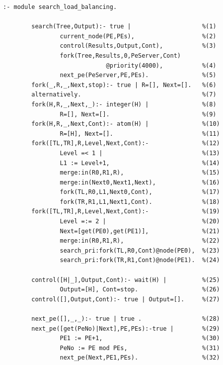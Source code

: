 \documentclass[a4,titlepage]{jsreport}
\begin{document}
\begin{Verbatim}[baselinestretch=0.8]
:- module search_load_balancing.

        search(Tree,Output):- true |                    %(1)
                current_node(PE,PEs),                   %(2)
                control(Results,Output,Cont),           %(3)
                fork(Tree,Results,0,PeServer,Cont)
                             @priority(4000),           %(4)
                next_pe(PeServer,PE,PEs).               %(5)
        fork(_,R,_,Next,stop):- true | R=[], Next=[].   %(6)
        alternatively.                                  %(7)
        fork(H,R,_,Next,_):- integer(H) |               %(8)
                R=[], Next=[].                          %(9)
        fork(H,R,_,Next,Cont):- atom(H) |               %(10)
                R=[H], Next=[].                         %(11)
        fork([TL,TR],R,Level,Next,Cont):-               %(12)
                Level =< 1 |                            %(13)
                L1 := Level+1,                          %(14)
                merge:in(R0,R1,R),                      %(15)
                merge:in(Next0,Next1,Next),             %(16)
                fork(TL,R0,L1,Next0,Cont),              %(17)
                fork(TR,R1,L1,Next1,Cont).              %(18)
        fork([TL,TR],R,Level,Next,Cont):-               %(19)
                Level =:= 2 |                           %(20)
                Next=[get(PE0),get(PE1)],               %(21)
                merge:in(R0,R1,R),                      %(22)
                search_pri:fork(TL,R0,Cont)@node(PE0),  %(23)
                search_pri:fork(TR,R1,Cont)@node(PE1).  %(24)

        control([H|_],Output,Cont):- wait(H) |          %(25)
                Output=[H], Cont=stop.                  %(26)
        control([],Output,Cont):- true | Output=[].     %(27)
        
        next_pe([],_,_):- true | true .                 %(28)
        next_pe([get(PeNo)|Next],PE,PEs):-true |        %(29)
                PE1 := PE+1,                            %(30)
                PeNo := PE mod PEs,                     %(31)
                next_pe(Next,PE1,PEs).                  %(32)
\end{Verbatim} 
\end{document}
